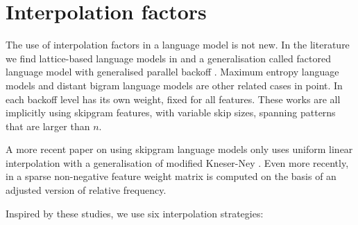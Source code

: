 
\section{Interpolation factors}

The use of interpolation factors in a language model is not new. In the literature we find lattice-based language models in
\cite{dupont1997lattice} and a generalisation called factored language model with generalised parallel backoff \cite{bilmes2003factored}. 
  Maximum entropy language models \cite{ROSENFELD1996187} and distant bigram language models \cite{bassiou2011long} are other related cases in point. In \cite{gao2004long} each backoff level has its own weight, fixed for all features. These works are all implicitly using skipgram features, with variable skip sizes, spanning patterns that are larger than $n$. 
  

  A more recent paper on using skipgram language models only uses uniform linear interpolation with a generalisation of modified Kneser-Ney \cite{pickhardt2014generalized}. Even more recently, in \cite{pelemans2016sparse} a sparse non-negative feature weight matrix is computed on the basis of an adjusted version of relative frequency.
  
Inspired by these studies, we use six interpolation strategies:
  
